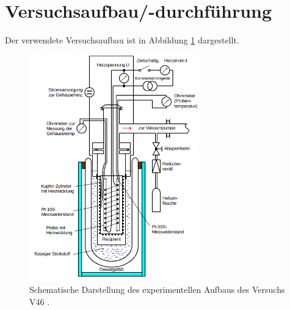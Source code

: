 \section{Versuchsaufbau/-durchführung}
Der verwendete Versuchsaufbau ist in Abbildung \ref{fig: aufbau} dargestellt.
\begin{figure}
  \centering
  \includegraphics[width = 0.65\textwidth]{./content/images/aufbau.png}
  \caption{Schematische Darstellung des experimentellen Aufbaus des Versuchs V46  \cite{anleitungV47}.}
  \label{fig: aufbau}
\end{figure}

